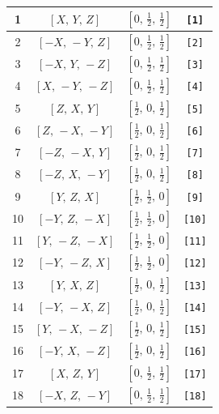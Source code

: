 \documentclass[fleqn,8pt]{jsarticle}
\begin{document}
\begin{longtable}{cccc}
1 & $\left[ X,\, Y,\, Z \right]$ & $\left[ 0,\, \frac{1}{2},\, \frac{1}{2} \right]$ & {\tt [1]} \\ \hline
2 & $\left[ - X,\, - Y,\, Z \right]$ & $\left[ 0,\, \frac{1}{2},\, \frac{1}{2} \right]$ & {\tt [2]} \\ \hline
3 & $\left[ - X,\, Y,\, - Z \right]$ & $\left[ 0,\, \frac{1}{2},\, \frac{1}{2} \right]$ & {\tt [3]} \\ \hline
4 & $\left[ X,\, - Y,\, - Z \right]$ & $\left[ 0,\, \frac{1}{2},\, \frac{1}{2} \right]$ & {\tt [4]} \\ \hline
5 & $\left[ Z,\, X,\, Y \right]$ & $\left[ \frac{1}{2},\, 0,\, \frac{1}{2} \right]$ & {\tt [5]} \\ \hline
6 & $\left[ Z,\, - X,\, - Y \right]$ & $\left[ \frac{1}{2},\, 0,\, \frac{1}{2} \right]$ & {\tt [6]} \\ \hline
7 & $\left[ - Z,\, - X,\, Y \right]$ & $\left[ \frac{1}{2},\, 0,\, \frac{1}{2} \right]$ & {\tt [7]} \\ \hline
8 & $\left[ - Z,\, X,\, - Y \right]$ & $\left[ \frac{1}{2},\, 0,\, \frac{1}{2} \right]$ & {\tt [8]} \\ \hline
9 & $\left[ Y,\, Z,\, X \right]$ & $\left[ \frac{1}{2},\, \frac{1}{2},\, 0 \right]$ & {\tt [9]} \\ \hline
10 & $\left[ - Y,\, Z,\, - X \right]$ & $\left[ \frac{1}{2},\, \frac{1}{2},\, 0 \right]$ & {\tt [10]} \\ \hline
11 & $\left[ Y,\, - Z,\, - X \right]$ & $\left[ \frac{1}{2},\, \frac{1}{2},\, 0 \right]$ & {\tt [11]} \\ \hline
12 & $\left[ - Y,\, - Z,\, X \right]$ & $\left[ \frac{1}{2},\, \frac{1}{2},\, 0 \right]$ & {\tt [12]} \\ \hline
13 & $\left[ Y,\, X,\, Z \right]$ & $\left[ \frac{1}{2},\, 0,\, \frac{1}{2} \right]$ & {\tt [13]} \\ \hline
14 & $\left[ - Y,\, - X,\, Z \right]$ & $\left[ \frac{1}{2},\, 0,\, \frac{1}{2} \right]$ & {\tt [14]} \\ \hline
15 & $\left[ Y,\, - X,\, - Z \right]$ & $\left[ \frac{1}{2},\, 0,\, \frac{1}{2} \right]$ & {\tt [15]} \\ \hline
16 & $\left[ - Y,\, X,\, - Z \right]$ & $\left[ \frac{1}{2},\, 0,\, \frac{1}{2} \right]$ & {\tt [16]} \\ \hline
17 & $\left[ X,\, Z,\, Y \right]$ & $\left[ 0,\, \frac{1}{2},\, \frac{1}{2} \right]$ & {\tt [17]} \\ \hline
18 & $\left[ - X,\, Z,\, - Y \right]$ & $\left[ 0,\, \frac{1}{2},\, \frac{1}{2} \right]$ & {\tt [18]} \\ \hline

\end{longtable}
\end{document}
